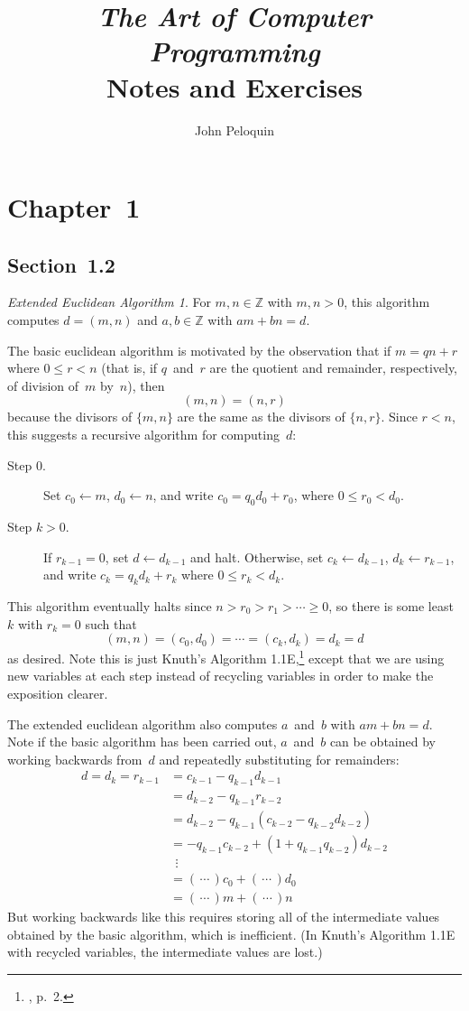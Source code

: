 \documentclass[letterpaper,12pt]{article}
\title{\textit{The Art of Computer Programming}\\Notes and Exercises}
\author{John Peloquin}
\date{}
\newcommand{\Z}{\mathbb{Z}}
\newcommand{\set}{\leftarrow}
\theoremstyle{remark}
\newtheorem*{extendedeuclid}{Extended Euclidean Algorithm}
\begin{document}
\maketitle
\section*{Chapter~1}
\subsection*{Section~1.2}
\begin{extendedeuclid}
For \(m,n\in\Z\) with \(m,n>0\), this algorithm computes \(d=(m,n)\) and \(a,b\in\Z\) with \(am+bn=d\).

The basic euclidean algorithm is motivated by the observation that if \(m=qn+r\) where \(0\le r<n\) (that is, if \(q\)~and~\(r\) are the quotient and remainder, respectively, of division of~\(m\) by~\(n\)), then
\begin{equation}
(m,n)=(n,r)
\end{equation}
because the divisors of \(\{m,n\}\) are the same as the divisors of \(\{n,r\}\). Since \(r<n\), this suggests a recursive algorithm for computing~\(d\):
\begin{description}
\item[Step 0.] Set \(c_{0}\set m\), \(d_{0}\set n\), and write \(c_{0}=q_{0}d_{0}+r_{0}\), where \(0\le r_{0}<d_{0}\).
\item[Step \(k>0\).] If \(r_{k-1}=0\), set \(d\set d_{k-1}\) and halt. Otherwise, set \(c_{k}\set d_{k-1}\), \(d_{k}\set r_{k-1}\), and write \(c_{k}=q_{k}d_{k}+r_{k}\) where \(0\le r_{k}<d_{k}\).
\end{description}
This algorithm eventually halts since \(n>r_{0}>r_{1}>\cdots\ge0\), so there is some least~\(k\) with \(r_{k}=0\) such that
\[(m,n)=(c_{0},d_{0})=\cdots=(c_{k},d_{k})=d_{k}=d\]
as desired. Note this is just Knuth's Algorithm 1.1E,\footnote{\cite{knuth1}, p.~2.} except that we are using new variables at each step instead of recycling variables in order to make the exposition clearer.

The extended euclidean algorithm also computes \(a\)~and~\(b\) with \(am+bn=d\). Note if the basic algorithm has been carried out, \(a\)~and~\(b\) can be obtained by working backwards from~\(d\) and repeatedly substituting for remainders:
\begin{align*}
d=d_{k}=r_{k-1}&=c_{k-1}-q_{k-1}d_{k-1}\\
			&=d_{k-2}-q_{k-1}r_{k-2}\\
			&=d_{k-2}-q_{k-1}(c_{k-2}-q_{k-2}d_{k-2})\\
			&=-q_{k-1}c_{k-2}+(1+q_{k-1}q_{k-2})d_{k-2}\\
			&\ \ \vdots\\
			&=(\,\cdots\,)c_{0}+(\,\cdots\,)d_{0}\\
			&=(\,\cdots\,)m+(\,\cdots\,)n
\end{align*}
But working backwards like this requires storing all of the intermediate values obtained by the basic algorithm, which is inefficient. (In Knuth's Algorithm 1.1E with recycled variables, the intermediate values are lost.)


\end{extendedeuclid}
\end{document}
